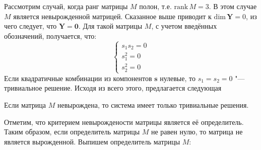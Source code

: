 Рассмотрим случай, когда ранг матрицы $M$ полон, т.е. $\textrm{rank}\,M = 3$. В этом случае $M$ 
является невырожденной матрицей. Сказанное выше приводит к $\textrm{dim}\,\mathbf{Y} = 0$, из чего 
следует, что $\mathbf{Y} = \mathbf{0}$. Для такой матрицы $M$, с учетом введённых обозначений, 
получается, что: 
$$
	\begin{cases}
		s_1 s_2 = 0 \\
		s_1 ^ 2 = 0 \\
		s_2 ^ 2 = 0
	\end{cases}
$$
Если квадратичные комбинации из компонентов $\mathbf{s}$ нулевые, то $s_1 = s_2 = 0$ "--- тривиальное 
решение. Исходя из всего этого, предлагается следующая
\begin{theorem} \label{thm:theorem_one}
Если матрица $M$ невырождена, то система имеет только тривиальные решения.
\end{theorem}
Отметим, что критерием невырождености матрицы является её определитель. Таким образом, если 
определитель матрицы $M$ не равен нулю, то матрица не является вырожденной. Выпишем определитель 
матрицы $M$:
